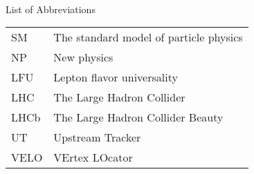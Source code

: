 \singlespacing \normalsize
\hbox{\ }

\vspace{.5in}

\begin{center}
\large{List of Abbreviations}
\end{center}

\vspace{3pt}

\begin{supertabular}{ll}
    SM    & The standard model of particle physics \\
    NP    & New physics \\
    LFU   & Lepton flavor universality \\
    LHC   & The Large Hadron Collider \\
    LHCb  & The Large Hadron Collider Beauty \\
    UT    & Upstream Tracker \\
    VELO  & VErtex LOcator \\
\end{supertabular}
